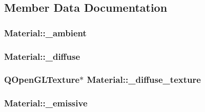 \subsection{Member Data Documentation}
\hypertarget{class_material_a4c29044a3f7e8008eb3a0666c4ce09b9}{
\subsubsection[{\+\_\+ambient}]{ Material\+::\+\_\+ambient\hspace{0.3cm}{\ttfamily [private]}}}\label{class_material_a4c29044a3f7e8008eb3a0666c4ce09b9}
\hypertarget{class_material_a402005729d7d5a147d51dfcd691d2ffa}{
\subsubsection[{\+\_\+diffuse}]{ Material\+::\+\_\+diffuse\hspace{0.3cm}{\ttfamily [private]}}}\label{class_material_a402005729d7d5a147d51dfcd691d2ffa}
\hypertarget{class_material_a522d07896a1363e987d09d8e4b66c156}{
\subsubsection[{\+\_\+diffuse\+\_\+texture}]{\setlength{\rightskip}{0pt plus 5cm}Q\+Open\+G\+L\+Texture$\ast$ Material\+::\+\_\+diffuse\+\_\+texture\hspace{0.3cm}{\ttfamily [private]}}}\label{class_material_a522d07896a1363e987d09d8e4b66c156}
\hypertarget{class_material_a7c2eb5e499b3f46ec6e9d62f02653879}{
\subsubsection[{\+\_\+emissive}]{ Material\+::\+\_\+emissive\hspace{0.3cm}{\ttfamily [private]}}}\label{class_material_a7c2eb5e499b3f46ec6e9d62f02653879}
